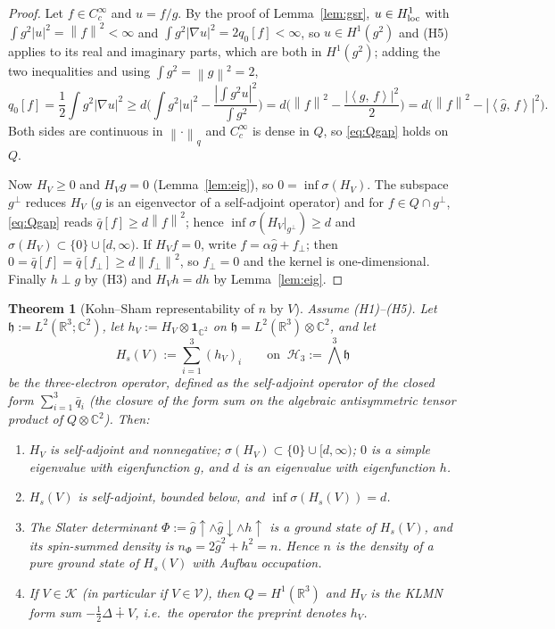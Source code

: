 \documentclass[11pt,a4paper]{article}
\theoremstyle{plain}
\newtheorem{theorem}{Theorem}[section]
\theoremstyle{definition}
\theoremstyle{remark}
\newcommand{\R}{\mathbb{R}}
\newcommand{\C}{\mathbb{C}}
\newcommand{\VV}{\mathcal{V}}
\newcommand{\KK}{\mathcal{K}}
\newcommand{\norm}[1]{\left\|#1\right\|}
\newcommand{\ip}[2]{\left\langle #1,\,#2\right\rangle}
\newcommand{\hg}{\hat g}
\begin{document}
\begin{proof}
Let $f\in C_c^\infty$ and $u=f/g$. By the proof of Lemma~\ref{lem:gsr}, $u\in H^1_{\rm loc}$ with $\int g^2|u|^2=\norm f^2<\infty$ and $\int g^2|\nabla u|^2=2q_0[f]<\infty$, so $u\in H^1(g^2)$ and (H5) applies to its real and imaginary parts, which are both in $H^1(g^2)$; adding the two inequalities and using $\int g^2=\norm g^2=2$,
\[
q_0[f]=\frac12\int g^2|\nabla u|^2\ge d\Big(\int g^2|u|^2-\frac{|\int g^2u|^2}{\int g^2}\Big)=d\Big(\norm f^2-\frac{|\ip gf|^2}{2}\Big)=d\big(\norm f^2-|\ip{\hg}f|^2\big).
\]
Both sides are continuous in $\norm\cdot_q$ and $C_c^\infty$ is dense in $Q$, so \eqref{eq:Qgap} holds on $Q$.

Now $H_V\ge0$ and $H_V g=0$ (Lemma~\ref{lem:eig}), so $0=\inf\sigma(H_V)$. The subspace $g^\perp$ reduces $H_V$ ($g$ is an eigenvector of a self-adjoint operator) and for $f\in Q\cap g^\perp$, \eqref{eq:Qgap} reads $\bar q[f]\ge d\norm f^2$; hence $\inf\sigma(H_V|_{g^\perp})\ge d$ and $\sigma(H_V)\subset\{0\}\cup[d,\infty)$. If $H_Vf=0$, write $f=\alpha\hg+f_\perp$; then $0=\bar q[f]=\bar q[f_\perp]\ge d\norm{f_\perp}^2$, so $f_\perp=0$ and the kernel is one-dimensional. Finally $h\perp g$ by (H3) and $H_Vh=dh$ by Lemma~\ref{lem:eig}.
\end{proof}

\begin{theorem}[Kohn--Sham representability of $n$ by $V$]\label{thm:A}
Assume (H1)--(H5). Let $\mathfrak h:=L^2(\R^3;\C^2)$, let $h_V:=H_V\otimes\mathbf 1_{\C^2}$ on $\mathfrak h=L^2(\R^3)\otimes\C^2$, and let
\[
H_s(V):=\sum_{i=1}^3(h_V)_i\qquad\text{on }\ \mathcal H_3:=\bigwedge^3\mathfrak h
\]
be the three-electron operator, defined as the self-adjoint operator of the closed form $\sum_{i=1}^3\bar q_i$ (the closure of the form sum on the algebraic antisymmetric tensor product of $Q\otimes\C^2$). Then:
\begin{enumerate}
\item[(i)] $H_V$ is self-adjoint and nonnegative; $\sigma(H_V)\subset\{0\}\cup[d,\infty)$; $0$ is a simple eigenvalue with eigenfunction $g$, and $d$ is an eigenvalue with eigenfunction $h$.
\item[(ii)] $H_s(V)$ is self-adjoint, bounded below, and $\inf\sigma(H_s(V))=d$.
\item[(iii)] The Slater determinant $\Phi:=\hg\!\uparrow\wedge\hg\!\downarrow\wedge h\!\uparrow$ is a ground state of $H_s(V)$, and its spin-summed density is $n_\Phi=2\hg^2+h^2=n$. Hence $n$ is the density of a pure ground state of $H_s(V)$ with Aufbau occupation.
\item[(iv)] If $V\in\KK$ (in particular if $V\in\VV$), then $Q=H^1(\R^3)$ and $H_V$ is the KLMN form sum $-\tfrac12\Delta\dotplus V$, i.e.\ the operator the preprint denotes $h_V$.
\end{enumerate}
\end{theorem}
\end{document}
